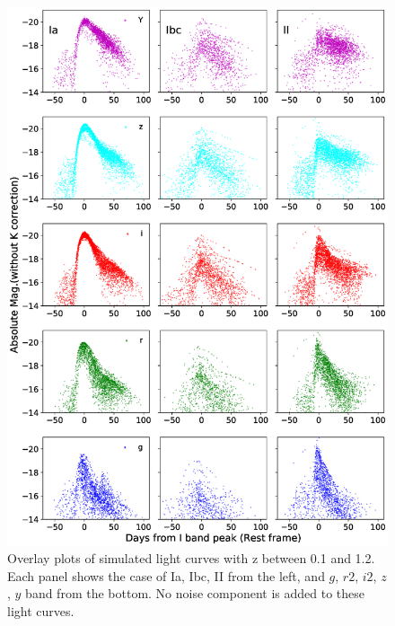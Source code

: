 \documentclass[useamsfonts]{pasj01}
\begin{document}
\begin{figure}[htbp]
  \begin{center}
     \includegraphics[width=\columnwidth]{figures/SimLCsamples.eps}
  \end{center}
  \vspace{-6mm}
  \caption{%
  Overlay plots of simulated light curves with z between 0.1 and 1.2.
  Each panel shows the case of Ia, Ibc, II from the left, and $g$, $r2$, $i2$, $z$, $y$ band from the bottom.
  No noise component is added to these light curves.
  }%
  
  \label{fig:simLCsamples}
\end{figure}
%
%
\end{document}
